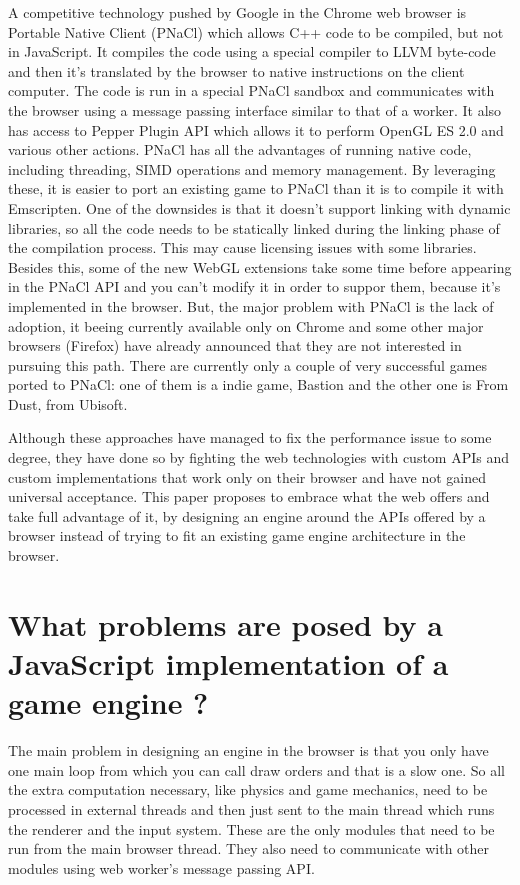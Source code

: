 A competitive technology pushed by Google in the Chrome web browser is Portable Native Client (PNaCl) which allows C++ code to be compiled, but not in JavaScript. It compiles the code using a special compiler to LLVM byte-code and then it's translated by the browser to native instructions on the client computer. The code is run in a special PNaCl sandbox and communicates with the browser using a message passing interface similar to that of a worker. It also has access to Pepper Plugin API which allows it to perform OpenGL ES 2.0 and various other actions. PNaCl has all the advantages of running native code, including threading, SIMD operations and memory management. By leveraging these, it is easier to port an existing game to PNaCl than it is to compile it with Emscripten. One of the downsides is that it doesn't support linking with dynamic libraries, so all the code needs to be statically linked during the linking phase of the compilation process. This may cause licensing issues with some libraries. Besides this, some of the new WebGL extensions take some time before appearing in the PNaCl API and you can't modify it in order to suppor them, because it's implemented in the browser. But, the major problem with PNaCl is the lack of adoption, it beeing currently available only on Chrome and some other major browsers (Firefox) have already announced that they are not interested in pursuing this path. There are currently only a couple of very successful games ported to PNaCl: one of them is a indie game, Bastion and the other one is From Dust, from Ubisoft.


Although these approaches have managed to fix the performance issue to some degree, they have done so by fighting the web technologies with custom APIs and custom implementations that work only on their browser and have not gained universal acceptance. This paper proposes to embrace what the web offers and take full advantage of it, by designing an engine around the APIs offered by a browser instead of trying to fit an existing game engine architecture in the browser.


\section{What problems are posed by a JavaScript implementation of a game engine ?}
\label{sec:game engine}

The main problem in designing an engine in the browser is that you only have one main loop from which you can call draw orders and that is a slow one. So all the extra computation necessary, like physics and game mechanics, need to be processed in external threads and then just sent to the main thread which runs the renderer and the input system. These are the only modules that need to be run from the main browser thread. They also need to communicate with other modules using web worker's message passing API.

